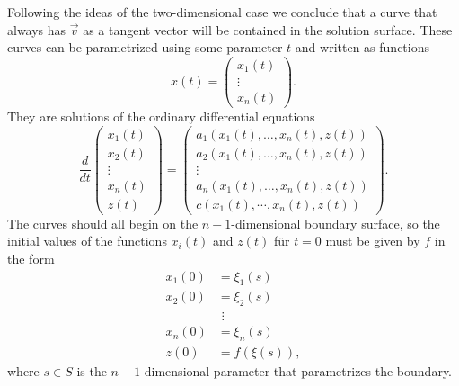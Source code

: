 Following the ideas of the two-dimensional case we conclude that a
curve that always has $\vec{v}$ as a tangent vector will be contained
in the solution surface.
These curves can be parametrized using some parameter $t$ and written
as functions
\begin{equation}
x(t)
=
\begin{pmatrix}
x_1(t)\\
\vdots\\
x_n(t)
\end{pmatrix}.
\label{qlpden:charparam}
\end{equation}
They are solutions of the ordinary differential equations
\begin{equation}
\frac{d}{dt}
\begin{pmatrix}
x_1(t)\\
x_2(t)\\
\vdots\\
x_n(t)\\
z(t)
\end{pmatrix}
=
\begin{pmatrix}
a_1(x_1(t),\dots,x_n(t),z(t))\\
a_2(x_1(t),\dots,x_n(t),z(t))\\
\vdots \\
a_n(x_1(t),\dots,x_n(t),z(t))\\
c(x_1(t),\cdots,x_n(t),z(t))
\end{pmatrix}.
\label{qlpden:chareqn}
\end{equation}
The curves should all begin on the $n-1$-dimensional boundary surface,
so the initial values of the functions $x_i(t)$ and $z(t)$ für $t=0$ 
must be given by $f$ in the form
\begin{equation}
\begin{aligned}
x_1(0) &= \xi_1(s)
\\
x_2(0) &= \xi_2(s)
\\
&\phantom{i}\vdots
\\
x_n(0) &= \xi_n(s)
\\
z(0) &= f(\xi(s)),
\end{aligned}
\label{qlpden:initial}
\end{equation}
where $s\in S$ is the $n-1$-dimensional parameter that parametrizes the
boundary.

